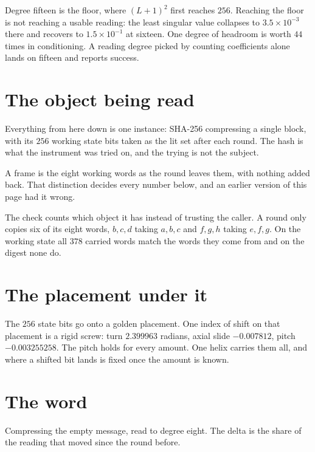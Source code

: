 Degree fifteen is the floor, where \((L+1)^2\) first reaches \(256\). Reaching the floor is not reaching a usable reading: the least singular value collapses to \(3.5 \times 10^{-3}\) there and recovers to \(1.5 \times 10^{-1}\) at sixteen. One degree of headroom is worth \(44\) times in conditioning. A reading degree picked by counting coefficients alone lands on fifteen and reports success.

\section{The object being read}

Everything from here down is one instance: SHA-256 compressing a single block, with its \(256\) working state bits taken as the lit set after each round. The hash is what the instrument was tried on, and the trying is not the subject.

A frame is the eight working words as the round leaves them, with nothing added back. That distinction decides every number below, and an earlier version of this page had it wrong.

The check counts which object it has instead of trusting the caller. A round only copies six of its eight words, \(b,c,d\) taking \(a,b,c\) and \(f,g,h\) taking \(e,f,g\). On the working state all \(378\) carried words match the words they come from and on the digest none do.

\section{The placement under it}

The \(256\) state bits go onto a golden placement. One index of shift on that placement is a rigid screw: turn \(2.399963\) radians, axial slide \(-0.007812\), pitch \(-0.003255258\). The pitch holds for every amount. One helix carries them all, and where a shifted bit lands is fixed once the amount is known.

\section{The word}

Compressing the empty message, read to degree eight. The delta is the share of the reading that moved since the round before.


